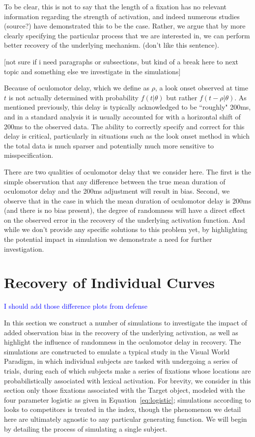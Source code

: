 \documentclass{article}
\providecommand{\cn}[1]{\textcolor{blue}{#1}}
\begin{document}
To be clear, this is not to say that the length of a fixation has no relevant information regarding the strength of activation, and indeed numerous studies (source?) have demonstrated this to be the case. Rather, we argue that by more clearly specifying the particular process that we are interested in, we can perform better recovery of the underlying mechanism. (don't like this sentence).

[not sure if i need paragraphs or subsections, but kind of a break here to next topic and something else we investigate in the simulations]

Because of oculomotor delay, which we define as $\rho$, a look onset observed at time $t$ is not actually determined with probability $f(t|\theta)$ but rather $f(t - \rho|\theta)$. As mentioned previously, this delay is typically acknowledged to be ``roughly" 200ms, and in a standard analysis it is usually accounted for with a horizontal shift of 200ms to the observed data. The ability to correctly specify and correct for this delay is critical, particularly in situations such as the look onset method in which the total data is much sparser and potentially much more sensitive to misspecification. 

There are two qualities of oculomotor delay that we consider here. The first is the simple observation that any difference between the true mean duration of oculomotor delay and the 200ms adjustment will result in bias. Second, we observe that in the case in which the mean duration of oculomotor delay is 200ms (and there is no bias present), the degree of randomness will have a direct effect on the observed error in the recovery of the underlying activation function. And while we don't provide any specific solutions to this problem yet, by highlighting the potential impact in simulation we demonstrate a need for further investigation.




\section{Recovery of Individual Curves}\label{sec:ind_curves}

\cn{I should add those difference plots from defense}

In this section we construct a number of simulations to investigate the impact of added observation bias in the recovery of the underlying activation, as well as highlight the influence of randomness in the oculomotor delay in recovery. The simulations are constructed to emulate a typical study in the Visual World Paradigm, in which individual subjects are tasked with undergoing a series of trials, during each of which subjects make a series of fixations whose locations are probabilistically associated with lexical activation. For brevity, we consider in this section only those fixations associated with the Target object, modeled with the four parameter logistic as given in Equation~\ref{eq:logistic}; simulations according to looks to competitors is treated in the index, though the phenomenon we detail here are ultimately agnostic to any particular generating function. We will begin by detailing the process of simulating a single subject. 
\end{document}
